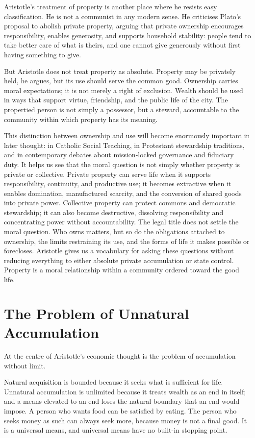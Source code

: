 \documentclass[11pt,a4paper,oneside]{book}
\begin{document}
Aristotle's treatment of property is another place where he resists easy classification. He is not a communist in any modern sense. He criticises Plato's proposal to abolish private property, arguing that private ownership encourages responsibility, enables generosity, and supports household stability: people tend to take better care of what is theirs, and one cannot give generously without first having something to give.

But Aristotle does not treat property as absolute. Property may be privately held, he argues, but its use should serve the common good. Ownership carries moral expectations; it is not merely a right of exclusion. Wealth should be used in ways that support virtue, friendship, and the public life of the city. The propertied person is not simply a possessor, but a steward, accountable to the community within which property has its meaning.

This distinction between ownership and use will become enormously important in later thought: in Catholic Social Teaching, in Protestant stewardship traditions, and in contemporary debates about mission-locked governance and fiduciary duty. It helps us see that the moral question is not simply whether property is private or collective. Private property can serve life when it supports responsibility, continuity, and productive use; it becomes extractive when it enables domination, manufactured scarcity, and the conversion of shared goods into private power. Collective property can protect commons and democratic stewardship; it can also become destructive, dissolving responsibility and concentrating power without accountability. The legal title does not settle the moral question. Who owns matters, but so do the obligations attached to ownership, the limits restraining its use, and the forms of life it makes possible or forecloses. Aristotle gives us a vocabulary for asking these questions without reducing everything to either absolute private accumulation or state control. Property is a moral relationship within a community ordered toward the good life.

\section*{The Problem of Unnatural Accumulation}

At the centre of Aristotle's economic thought is the problem of accumulation without limit.

Natural acquisition is bounded because it seeks what is sufficient for life. Unnatural accumulation is unlimited because it treats wealth as an end in itself; and a means elevated to an end loses the natural boundary that an end would impose. A person who wants food can be satisfied by eating. The person who seeks money as such can always seek more, because money is not a final good. It is a universal means, and universal means have no built-in stopping point.
\end{document}
